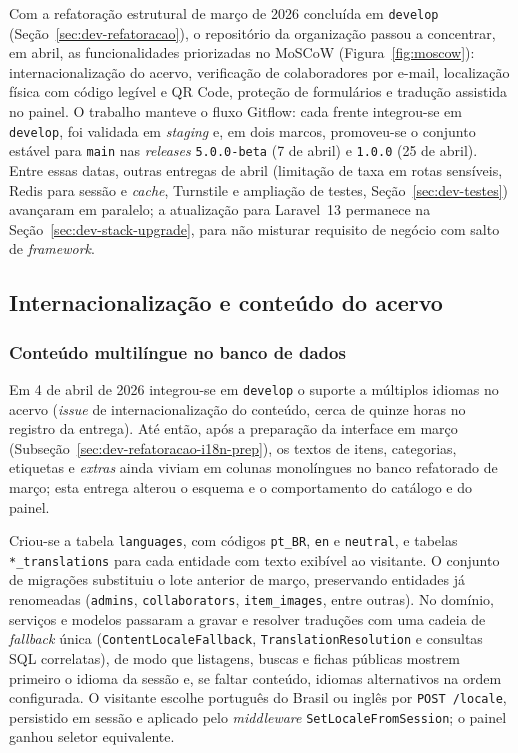 Com a refatoração estrutural de março de 2026 concluída em \texttt{develop} (Seção~\ref{sec:dev-refatoracao}), o repositório da organização passou a concentrar, em abril, as funcionalidades priorizadas no MoSCoW (Figura~\ref{fig:moscow}): internacionalização do acervo, verificação de colaboradores por e-mail, localização física com código legível e QR Code, proteção de formulários e tradução assistida no painel. O trabalho manteve o fluxo Gitflow: cada frente integrou-se em \texttt{develop}, foi validada em \textit{staging} e, em dois marcos, promoveu-se o conjunto estável para \texttt{main} nas \textit{releases} \texttt{5.0.0-beta} (7 de abril) e \texttt{1.0.0} (25 de abril). Entre essas datas, outras entregas de abril (limitação de taxa em rotas sensíveis, Redis para sessão e \textit{cache}, Turnstile e ampliação de testes, Seção~\ref{sec:dev-testes}) avançaram em paralelo; a atualização para Laravel~13 permanece na Seção~\ref{sec:dev-stack-upgrade}, para não misturar requisito de negócio com salto de \textit{framework}.


\subsection{Internacionalização e conteúdo do acervo}\label{sec:dev-func-i18n}

\subsubsection{Conteúdo multilíngue no banco de dados}\label{sec:dev-funcionalidades-i18n}

Em 4 de abril de 2026 integrou-se em \texttt{develop} o suporte a múltiplos idiomas no acervo (\textit{issue} de internacionalização do conteúdo, cerca de quinze horas no registro da entrega). Até então, após a preparação da interface em março (Subseção~\ref{sec:dev-refatoracao-i18n-prep}), os textos de itens, categorias, etiquetas e \textit{extras} ainda viviam em colunas monolíngues no banco refatorado de março; esta entrega alterou o esquema e o comportamento do catálogo e do painel.

Criou-se a tabela \texttt{languages}, com códigos \texttt{pt\_BR}, \texttt{en} e \texttt{neutral}, e tabelas \texttt{*\_translations} para cada entidade com texto exibível ao visitante. O conjunto de migrações substituiu o lote anterior de março, preservando entidades já renomeadas (\texttt{admins}, \texttt{collaborators}, \texttt{item\_images}, entre outras). No domínio, serviços e modelos passaram a gravar e resolver traduções com uma cadeia de \textit{fallback} única (\texttt{ContentLocaleFallback}, \texttt{TranslationResolution} e consultas SQL correlatas), de modo que listagens, buscas e fichas públicas mostrem primeiro o idioma da sessão e, se faltar conteúdo, idiomas alternativos na ordem configurada. O visitante escolhe português do Brasil ou inglês por \texttt{POST /locale}, persistido em sessão e aplicado pelo \textit{middleware} \texttt{SetLocaleFromSession}; o painel ganhou seletor equivalente.

